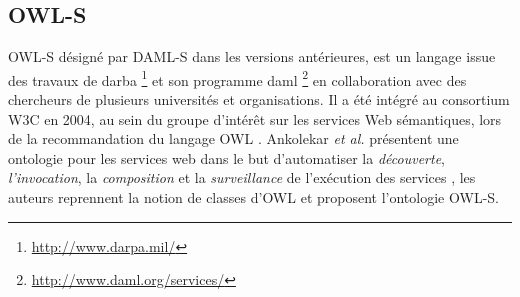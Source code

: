 
    \subsection{OWL-S}
    \label{sec:owl-s}

    \textsc{OWL-S} \cite{martin2004owl} désigné par \textsc{DAML-S}
    \cite{ankolekar2002daml} dans les versions antérieures, est un
    langage issue des travaux de \acrshort{darba}
    \footnote{\url{http://www.darpa.mil/}} et son programme
    \acrshort{daml} \footnote{\url{http://www.daml.org/services/}} en
    collaboration avec des chercheurs de plusieurs universités et
    organisations. Il a été intégré au consortium \textsc{W3C} en
    2004, au sein du groupe d'intérêt sur les services Web
    sémantiques, lors de la recommandation du langage \textsc{OWL}
    \cite{horrocks2002daml+oil} \cite{mcguinness2004owl}.  Ankolekar
    \emph{et al.}  \cite{ankolekar2002daml} présentent une ontologie
    pour les services web dans le but d'automatiser la
    \emph{découverte}, \emph{l'invocation}, la \emph{composition} et
    la \emph{surveillance} de l'exécution des services
    \cite{mcilraith2003bringing}, les auteurs reprennent la notion de
    classes d'\textsc{OWL} et proposent l'ontologie \textsc{OWL-S}.
    

